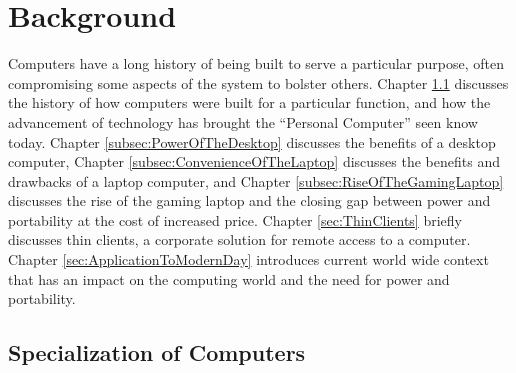\chapter{Background} %

\label{Chapter2} %

Computers have a long history of being built to serve a particular purpose, often compromising some aspects of the system to bolster others.
Chapter \ref{sec:SpecializationOfComputers} discusses the history of how computers were built for a particular function, and how the advancement of technology has brought the \enquote{Personal Computer} seen know today.
Chapter \ref{subsec:PowerOfTheDesktop} discusses the benefits of a desktop computer, Chapter \ref{subsec:ConvenienceOfTheLaptop} discusses the benefits and drawbacks of a laptop computer, and Chapter \ref{subsec:RiseOfTheGamingLaptop} discusses the rise of the gaming laptop and the closing gap between power and portability at the cost of increased price.
Chapter \ref{sec:ThinClients} briefly discusses thin clients, a corporate solution for remote access to a computer.
Chapter \ref{sec:ApplicationToModernDay} introduces current world wide context that has an impact on the computing world and the need for power and portability.

\section{Specialization of Computers}\label{sec:SpecializationOfComputers}

